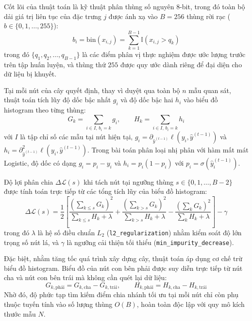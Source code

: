 Cốt lõi của thuật toán là kỹ thuật phân thùng số nguyên 8-bit, trong đó toàn bộ dải giá trị liên tục của đặc trưng $j$ được ánh xạ vào $B = 256$ thùng rời rạc ($b \in \{0, 1, \dots, 255\}$):
\begin{equation*}
    b_i = \text{bin}(x_{i,j}) = \sum_{k=1}^{B-1} \mathbb{I}(x_{i,j} > q_k)
\end{equation*}
trong đó $\{q_1, q_2, \dots, q_{B-1}\}$ là các điểm phân vị thực nghiệm được ước lượng trước trên tập huấn luyện, và thùng thứ $255$ được quy ước dành riêng để đại diện cho dữ liệu bị khuyết.

Tại mỗi nút của cây quyết định, thay vì duyệt qua toàn bộ $n$ mẫu quan sát, thuật toán tích lũy độ dốc bậc nhất $g_i$ và độ dốc bậc hai $h_i$ vào biểu đồ histogram theo từng thùng:
\begin{equation*}
    G_k = \sum_{i \in I, \, b_i = k} g_i, \qquad H_k = \sum_{i \in I, \, b_i = k} h_i
\end{equation*}
với $I$ là tập chỉ số các mẫu tại nút hiện tại, $g_i = \partial_{\hat{y}^{(t-1)}} \ell(y_i, \hat{y}^{(t-1)})$ và $h_i = \partial^2_{\hat{y}^{(t-1)}} \ell(y_i, \hat{y}^{(t-1)})$. Trong bài toán phân loại nhị phân với hàm mất mát Logistic, độ dốc có dạng $g_i = p_i - y_i$ và $h_i = p_i(1 - p_i)$ với $p_i = \sigma(\hat{y}_i^{(t-1)})$.

Độ lợi phân chia $\Delta \mathcal{L}(s)$ khi tách nút tại ngưỡng thùng $s \in \{0, 1, \dots, B-2\}$ được tính toán trực tiếp từ các tổng tích lũy của biểu đồ histogram:
\begin{equation*}
    \Delta \mathcal{L}(s) = \frac{1}{2} \left[ \frac{\left(\sum_{k \le s} G_k\right)^2}{\sum_{k \le s} H_k + \lambda} + \frac{\left(\sum_{k > s} G_k\right)^2}{\sum_{k > s} H_k + \lambda} - \frac{\left(\sum_{k} G_k\right)^2}{\sum_{k} H_k + \lambda} \right] - \gamma
\end{equation*}
trong đó $\lambda$ là hệ số điều chuẩn $L_2$ (\texttt{l2\_regularization}) nhằm kiểm soát độ lớn trọng số nút lá, và $\gamma$ là ngưỡng cải thiện tối thiểu (\texttt{min\_impurity\_decrease}).

Đặc biệt, nhằm tăng tốc quá trình xây dựng cây, thuật toán áp dụng cơ chế trừ biểu đồ histogram. Biểu đồ của nút con bên phải được suy diễn trực tiếp từ nút cha và nút con bên trái mà không cần quét lại dữ liệu:
\begin{equation*}
    G_{k, \text{phải}} = G_{k, \text{cha}} - G_{k, \text{trái}}, \qquad H_{k, \text{phải}} = H_{k, \text{cha}} - H_{k, \text{trái}}
\end{equation*}
Nhờ đó, độ phức tạp tìm kiếm điểm chia nhánh tối ưu tại mỗi nút chỉ còn phụ thuộc tuyến tính vào số lượng thùng $O(B)$, hoàn toàn độc lập với quy mô kích thước mẫu $N$.

